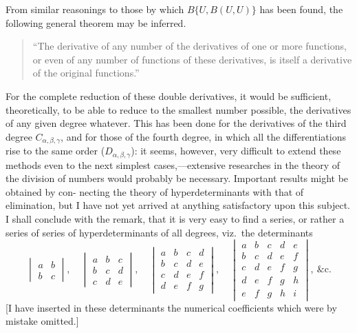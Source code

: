 \documentclass[12pt,a4paper]{article}
\begin{document}
From similar reasonings to those by which $B\{U, B(U, U)\}$ has been found, the
following general theorem may be inferred.

\begin{quote}
``The derivative of any number of the derivatives of one or more functions, or
even of any number of functions of these derivatives, is itself a derivative of the
original functions.''
\end{quote}

For the complete reduction of these double derivatives, it would be sufficient,
theoretically, to be able to reduce to the smallest number possible, the derivatives of
any given degree whatever. This has been done for the derivatives of the third degree
$C_{\alpha,\beta,\gamma}$, and for those of the fourth degree, in which all the differentiations rise to
the same order ($D_{\alpha,\beta,\gamma}$): it seems, however, very difficult to extend these methods even
to the next simplest cases,---extensive researches in the theory of the division of
numbers would probably be necessary. Important results might be obtained by con-
necting the theory of hyperdeterminants with that of elimination, but I have not yet
arrived at anything satisfactory upon this subject. I shall conclude with the remark,
that it is very easy to find a series, or rather a series of series of hyperdeterminants
of all degrees, viz.\ the determinants
\[
\begin{vmatrix}
a & b\\
b & c
\end{vmatrix},\quad
\begin{vmatrix}
a & b & c\\
b & c & d\\
c & d & e
\end{vmatrix},\quad
\begin{vmatrix}
a & b & c & d\\
b & c & d & e\\
c & d & e & f\\
d & e & f & g
\end{vmatrix},\quad
\begin{vmatrix}
a & b & c & d & e\\
b & c & d & e & f\\
c & d & e & f & g\\
d & e & f & g & h\\
e & f & g & h & i
\end{vmatrix},\ \&\text{c.}
\]
[I have inserted in these determinants the numerical coefficients which were by
mistake omitted.]
\end{document}
